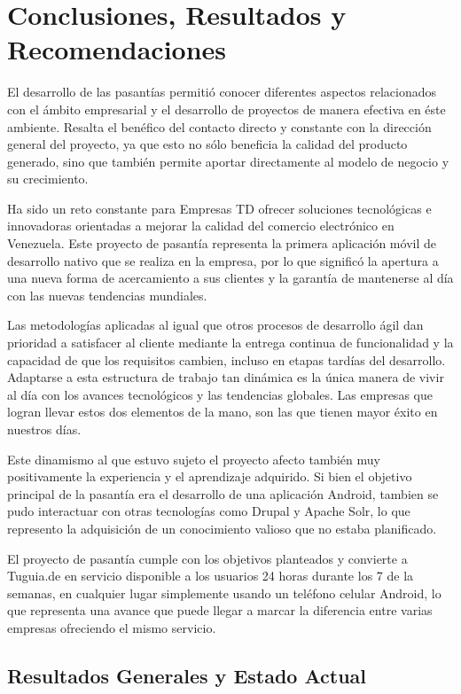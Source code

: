 \chapter{Conclusiones, Resultados y Recomendaciones}

El desarrollo de las pasantías permitió conocer diferentes aspectos relacionados con el ámbito empresarial y el desarrollo de proyectos de manera efectiva en éste ambiente. Resalta el benéfico del contacto directo y constante con la dirección general del proyecto, ya que esto no sólo beneficia la calidad del producto generado, sino que también permite aportar directamente al modelo de negocio y su crecimiento. 

Ha sido un reto constante para Empresas TD ofrecer soluciones tecnológicas e innovadoras orientadas a mejorar la calidad del comercio electrónico en Venezuela. Este proyecto de pasantía representa la primera aplicación móvil de desarrollo nativo que se realiza en la empresa, por lo que significó la apertura a una nueva forma de acercamiento a sus clientes y la garantía de mantenerse al día con las nuevas tendencias mundiales.

Las metodologías aplicadas al igual que otros procesos de desarrollo ágil dan prioridad a  satisfacer al cliente mediante la entrega continua de funcionalidad y la capacidad de que los requisitos cambien, incluso en etapas tardías del desarrollo. Adaptarse a esta estructura de trabajo tan dinámica es la única manera de vivir al día con los avances tecnológicos y las tendencias globales. Las empresas que logran llevar estos dos elementos de la mano, son las que tienen mayor éxito en nuestros días. 

Este dinamismo al que estuvo sujeto el proyecto afecto también muy positivamente la experiencia y el aprendizaje adquirido. Si bien el objetivo principal de la pasantía era el desarrollo de una aplicación Android, tambien se pudo interactuar con otras tecnologías como Drupal y Apache Solr, lo que represento la adquisición de un conocimiento valioso que no estaba planificado.

El proyecto de pasantía cumple con los objetivos planteados y convierte a Tuguia.de en servicio disponible a los usuarios 24 horas durante los 7 de la semanas, en cualquier lugar simplemente usando un teléfono celular Android, lo que representa una avance que puede llegar a marcar la diferencia entre varias empresas ofreciendo el mismo servicio.

\section{Resultados Generales y Estado Actual}

